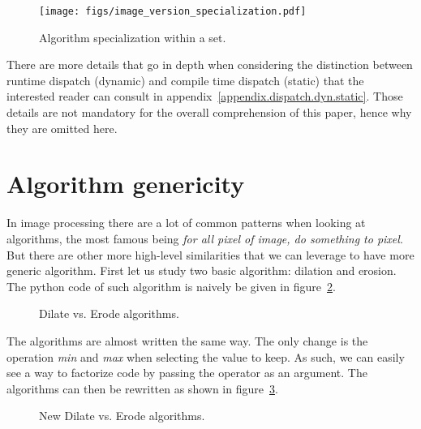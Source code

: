\begin{figure}[tbh]
  \centering
  \texttt{[image: figs/image\_version\_specialization.pdf]}
  \caption{Algorithm specialization within a set.}
  \label{fig.image.specialization}
\end{figure}

There are more details that go in depth when considering the distinction between runtime dispatch (dynamic) and
compile time dispatch (static) that the interested reader can consult in appendix~\ref{appendix.dispatch.dyn.static}.
Those details are not mandatory for the overall comprehension of this paper, hence why they are omitted here.


\section{Algorithm genericity}
\label{sec.algo}

In image processing there are a lot of common patterns when looking at algorithms, the most famous being \emph{for all
  pixel of image, do something to pixel}. But there are other more high-level similarities that we can leverage to have
more generic algorithm. First let us study two basic algorithm: dilation and erosion. The python code of such algorithm
is naively be given in figure~\ref{fig.erode.dilate}.

\begin{figure}[tbh]
  \centering
  \hfil
  \caption{Dilate vs. Erode algorithms.}
  \label{fig.erode.dilate}
\end{figure}

The algorithms are almost written the same way. The only change is the operation \emph{min} and \emph{max} when
selecting the value to keep. As such, we can easily see a way to factorize code by passing the operator as an argument.
The algorithms can then be rewritten as shown in figure~\ref{fig.erode.dilate.factorized}.

\begin{figure}[tbh]
  \centering
  \vfil
  \smallskip
  \hfil
  \caption{New Dilate vs. Erode algorithms.}
  \label{fig.erode.dilate.factorized}
\end{figure}

